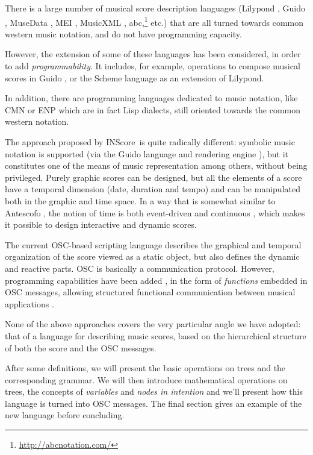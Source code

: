 \documentclass{article}
\newcommand{\IS}		{INScore}
\begin{document}
\vspace{5mm}
There is a large number of musical score description languages (Lilypond \cite{lilypond03}, Guido \cite{hoos98}, MuseData \cite{Hewlett97}, MEI \cite{Roland_2002}, MusicXML \cite{good01}, abc,\footnote{\url{http://abcnotation.com/}} etc.) that are all turned towards common western music notation, and do not have programming capacity. 

However, the extension of some of these languages has been considered, in order to add \textit{programmability}. It includes, for example, operations to compose musical scores in Guido \cite{fober12b}, or the Scheme language as an extension of Lilypond.

In addition, there are programming languages dedicated to music notation, like CMN \cite{Schottstaedt97} or ENP 
\cite{KUUSK06} which are in fact Lisp dialects, still oriented towards the common western notation.

The approach proposed by \IS\ is quite radically different: symbolic music notation is supported (via the Guido language and rendering engine \cite{Dau:09b,hoos98}), but it constitutes one of the means of music representation among others, without being privileged. 
Purely graphic scores can be designed, but all the elements of a score have a temporal dimension (date, duration and tempo) and can be manipulated both in the graphic and time space. In a way that is somewhat similar to Antescofo \cite{acont08}, the notion of time is both event-driven and continuous \cite{fober17c}, which makes it possible to design interactive and dynamic scores.

The current OSC-based scripting language describes the graphical and temporal organization of the score viewed as a static object, but also defines the dynamic and reactive parts.
OSC is basically a communication protocol. However, programming capabilities have been added \cite{429}, in the form of \emph{functions} embedded in OSC messages, allowing structured functional communication between musical applications \cite{bresson:hal-01353794}. 

None of the above approaches covers the very particular angle we have adopted: that of a language for describing music scores, based on the hierarchical structure of both the score and the OSC messages.

After some definitions, we will present the basic operations on trees and the corresponding grammar. We will then introduce mathematical operations on trees, the concepts of \emph{variables} and \emph{nodes in intention} and we'll present how this language is turned into OSC messages. The final section gives an example of the new language before concluding.
\end{document}
